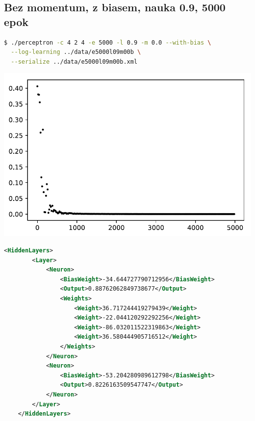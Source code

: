 \documentclass{classrep}
\begin{document}
\subsection{Bez momentum, z biasem, nauka 0.9, 5000 epok}
\begin{lstlisting}[language=bash]
$ ./perceptron -c 4 2 4 -e 5000 -l 0.9 -m 0.0 --with-bias \
  --log-learning ../data/e5000l09m00b \
  --serialize ../data/e5000l09m00b.xml
\end{lstlisting}
\begin{center}
 \includegraphics{sprawozdanie/output_0_11.pdf}
\end{center}
\begin{lstlisting}[language=xml]
    <HiddenLayers>
        <Layer>
            <Neuron>
                <BiasWeight>-34.644727790712956</BiasWeight>
                <Output>0.88762062849738677</Output>
                <Weights>
                    <Weight>36.717244419279439</Weight>
                    <Weight>-22.044120292292256</Weight>
                    <Weight>-86.032011522319863</Weight>
                    <Weight>36.580444905716512</Weight>
                </Weights>
            </Neuron>
            <Neuron>
                <BiasWeight>-53.204280989612798</BiasWeight>
                <Output>0.8226163509547747</Output>
            </Neuron>
        </Layer>
    </HiddenLayers>
\end{lstlisting}
\clearpage
\end{document}
